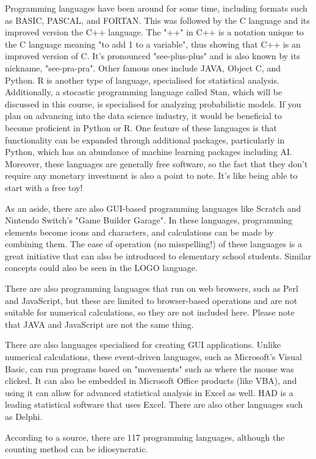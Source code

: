 \documentclass{ltjsbook}
\begin{document}
Programming languages have been around for some time, including formats such as BASIC, PASCAL, and FORTAN. This was followed by the C language and its improved version the C++ language. The "++" in C++ is a notation unique to the C language meaning "to add 1 to a variable", thus showing that C++ is an improved version of C. It's pronounced "see-plus-plus" and is also known by its nickname, "see-pra-pra". Other famous ones include JAVA, Object C, and Python. R is another type of language, specialised for statistical analysis. Additionally, a stocastic programming language called Stan, which will be discussed in this course, is specialised for analyzing probabilistic models. If you plan on advancing into the data science industry, it would be beneficial to become proficient in Python or R. One feature of these languages is that functionality can be expanded through additional packages, particularly in Python, which has an abundance of machine learning packages including AI. Moreover, these languages are generally free software, so the fact that they don't require any monetary investment is also a point to note. It's like being able to start with a free toy!

As an aside, there are also GUI-based programming languages like Scratch and Nintendo Switch's "Game Builder Garage". In these languages, programming elements become icons and characters, and calculations can be made by combining them. The ease of operation (no misspelling!) of these languages is a great initiative that can also be introduced to elementary school students. Similar concepts could also be seen in the LOGO language.

There are also programming languages that run on web browsers, such as Perl and JavaScript, but these are limited to browser-based operations and are not suitable for numerical calculations, so they are not included here. Please note that JAVA and JavaScript are not the same thing.

There are also languages specialised for creating GUI applications. Unlike numerical calculations, these event-driven languages, such as Microsoft's Visual Basic, can run programs based on "movements" such as where the mouse was clicked. It can also be embedded in Microsoft Office products (like VBA), and using it can allow for advanced statistical analysis in Excel as well. HAD is a leading statistical software that uses Excel. There are also other languages such as Delphi.

According to a source, there are 117 programming languages, although the counting method can be idiosyncratic.
\end{document}

